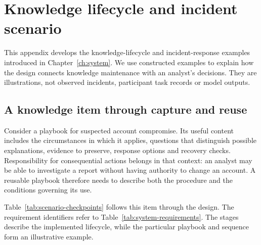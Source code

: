 \chapter{Knowledge lifecycle and incident scenario}\label{app:implementation}

This appendix develops the knowledge-lifecycle and incident-response examples introduced in Chapter~\ref{ch:system}. We use constructed examples to explain how the design connects knowledge maintenance with an analyst's decisions. They are illustrations, not observed incidents, participant task records or model outputs.

\section{A knowledge item through capture and reuse}
Consider a playbook for suspected account compromise. Its useful content includes the circumstances in which it applies, questions that distinguish possible explanations, evidence to preserve, response options and recovery checks. Responsibility for consequential actions belongs in that context: an analyst may be able to investigate a report without having authority to change an account. A reusable playbook therefore needs to describe both the procedure and the conditions governing its use.

Table~\ref{tab:scenario-checkpoints} follows this item through the design. The requirement identifiers refer to Table~\ref{tab:system-requirements}. The stages describe the implemented lifecycle, while the particular playbook and sequence form an illustrative example.

